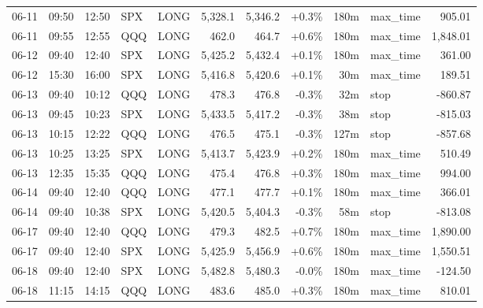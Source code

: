 \documentclass[11pt,a4paper,twoside]{article}
\begin{document}
\begin{center}
\begin{longtable}{>{\color{txtmain}}l l l l l r r r r >{\color{txtmain}}l r}
06-11 & 09:50 & 12:50 & SPX & LONG & 5,328.1 & 5,346.2 & \textcolor{wingreen}{+0.3\%} & 180m & max\_time & \textcolor{wingreen}{905.01} \\
06-11 & 09:55 & 12:55 & QQQ & LONG & 462.0 & 464.7 & \textcolor{wingreen}{+0.6\%} & 180m & max\_time & \textcolor{wingreen}{1,848.01} \\
06-12 & 09:40 & 12:40 & SPX & LONG & 5,425.2 & 5,432.4 & \textcolor{wingreen}{+0.1\%} & 180m & max\_time & \textcolor{wingreen}{361.00} \\
06-12 & 15:30 & 16:00 & SPX & LONG & 5,416.8 & 5,420.6 & \textcolor{wingreen}{+0.1\%} & 30m & max\_time & \textcolor{wingreen}{189.51} \\
06-13 & 09:40 & 10:12 & QQQ & LONG & 478.3 & 476.8 & \textcolor{lossred}{-0.3\%} & 32m & stop & \textcolor{lossred}{-860.87} \\
06-13 & 09:45 & 10:23 & SPX & LONG & 5,433.5 & 5,417.2 & \textcolor{lossred}{-0.3\%} & 38m & stop & \textcolor{lossred}{-815.03} \\
06-13 & 10:15 & 12:22 & QQQ & LONG & 476.5 & 475.1 & \textcolor{lossred}{-0.3\%} & 127m & stop & \textcolor{lossred}{-857.68} \\
06-13 & 10:25 & 13:25 & SPX & LONG & 5,413.7 & 5,423.9 & \textcolor{wingreen}{+0.2\%} & 180m & max\_time & \textcolor{wingreen}{510.49} \\
06-13 & 12:35 & 15:35 & QQQ & LONG & 475.4 & 476.8 & \textcolor{wingreen}{+0.3\%} & 180m & max\_time & \textcolor{wingreen}{994.00} \\
06-14 & 09:40 & 12:40 & QQQ & LONG & 477.1 & 477.7 & \textcolor{wingreen}{+0.1\%} & 180m & max\_time & \textcolor{wingreen}{366.01} \\
06-14 & 09:40 & 10:38 & SPX & LONG & 5,420.5 & 5,404.3 & \textcolor{lossred}{-0.3\%} & 58m & stop & \textcolor{lossred}{-813.08} \\
06-17 & 09:40 & 12:40 & QQQ & LONG & 479.3 & 482.5 & \textcolor{wingreen}{+0.7\%} & 180m & max\_time & \textcolor{wingreen}{1,890.00} \\
06-17 & 09:40 & 12:40 & SPX & LONG & 5,425.9 & 5,456.9 & \textcolor{wingreen}{+0.6\%} & 180m & max\_time & \textcolor{wingreen}{1,550.51} \\
06-18 & 09:40 & 12:40 & SPX & LONG & 5,482.8 & 5,480.3 & \textcolor{lossred}{-0.0\%} & 180m & max\_time & \textcolor{lossred}{-124.50} \\
06-18 & 11:15 & 14:15 & QQQ & LONG & 483.6 & 485.0 & \textcolor{wingreen}{+0.3\%} & 180m & max\_time & \textcolor{wingreen}{810.01} \\

\end{longtable}
\end{center}
\end{document}
